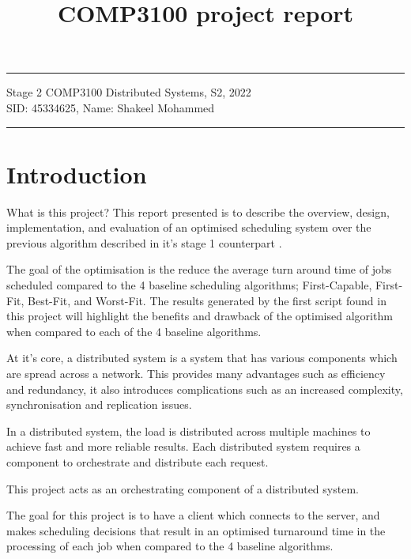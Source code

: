 \documentclass[a4paper]{article}
\begin{document}
\title{COMP3100 project report}
\hrule \medskip
\begin{minipage}{0.9\textwidth}
\centering 
\large
Stage 2 COMP3100 Distributed Systems, S2, 2022\\
\normalsize
SID: 45334625, Name: Shakeel Mohammed
\end{minipage}
\medskip\hrule
\bigskip

\section{Introduction}
What is this project?
This report presented is to describe the overview, design, implementation, and evaluation of an optimised scheduling system over the previous algorithm described in it's stage 1 counterpart \cite{s1-report}. 

The goal of the optimisation is the reduce the average turn around time of jobs scheduled compared to the 4 baseline scheduling algorithms; First-Capable, First-Fit, Best-Fit, and Worst-Fit. The results generated by the first script found in this project will highlight the benefits and drawback of the optimised algorithm when compared to each of the 4 baseline algorithms.

At it's core, a distributed system is a system that has various components which are spread across a network. This provides many advantages such as efficiency and redundancy, it also introduces complications such as an increased complexity, synchronisation and replication issues.

In a distributed system, the load is distributed across multiple machines to achieve fast and more reliable results. Each distributed system requires a component to orchestrate and distribute each request.

This project acts as an orchestrating component of a distributed system.

The goal for this project is to have a client which connects to the server, and makes scheduling decisions that result in an optimised turnaround time in the processing of each job when compared to the 4 baseline algorithms.
\end{document}
